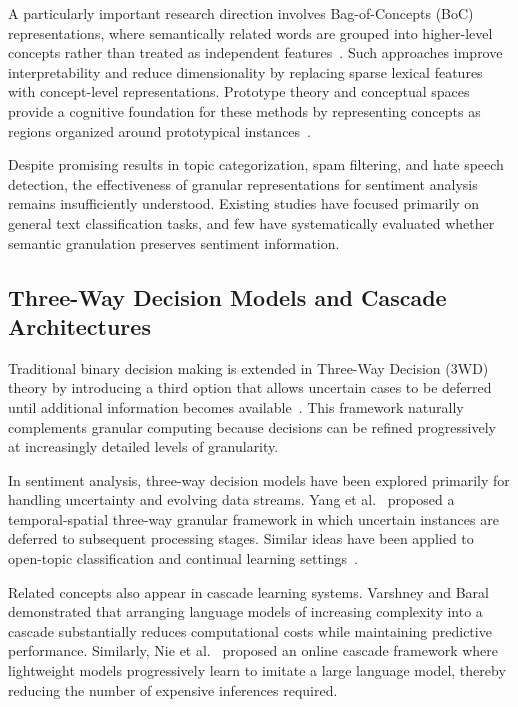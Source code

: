 \documentclass[a4paper,fleqn]{cas-dc}
\begin{document}
A particularly important research direction involves Bag-of-Concepts (BoC) representations, where semantically related words are grouped into higher-level concepts rather than treated as independent features~\cite{Capillo2020mining, Possemato2013AutomaticTC, DeSantis2023prototype}. Such approaches improve interpretability and reduce dimensionality by replacing sparse lexical features with concept-level representations. Prototype theory and conceptual spaces provide a cognitive foundation for these methods by representing concepts as regions organized around prototypical instances~\cite{DeSantis2023prototype}.

Despite promising results in topic categorization, spam filtering, and hate speech detection, the effectiveness of granular representations for sentiment analysis remains insufficiently understood. Existing studies have focused primarily on general text classification tasks, and few have systematically evaluated whether semantic granulation preserves sentiment information.

\subsection{Three-Way Decision Models and Cascade Architectures}

Traditional binary decision making is extended in Three-Way Decision (3WD) theory by introducing a third option that allows uncertain cases to be deferred until additional information becomes available~\cite{Yao2018threeway,Fujita2016threeway,id:Siminski20233WDNFS,id:Ptas2026Art,id:Siminski2026Towards}. This framework naturally complements granular computing because decisions can be refined progressively at increasingly detailed levels of granularity.

In sentiment analysis, three-way decision models have been explored primarily for handling uncertainty and evolving data streams. Yang et al.~\cite{Yang2022temporal} proposed a temporal-spatial three-way granular framework in which uncertain instances are deferred to subsequent processing stages. Similar ideas have been applied to open-topic classification and continual learning settings~\cite{Yang2022threeway}.

Related concepts also appear in cascade learning systems. Varshney and Baral~\cite{varshney2022model} demonstrated that arranging language models of increasing complexity into a cascade substantially reduces computational costs while maintaining predictive performance. Similarly, Nie et al.~\cite{nie2024online} proposed an online cascade framework where lightweight models progressively learn to imitate a large language model, thereby reducing the number of expensive inferences required.
\end{document}
